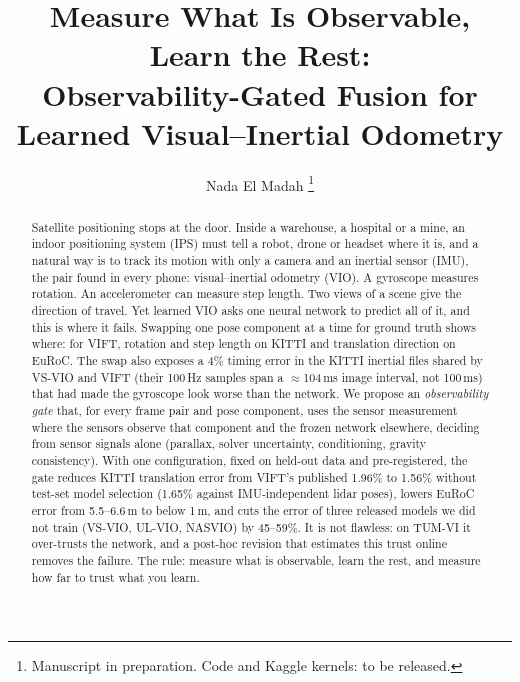 \documentclass[letterpaper,journal]{IEEEtran}
\begin{document}
\title{Measure What Is Observable, Learn the Rest:\\Observability-Gated Fusion for Learned Visual--Inertial Odometry}

\author{Nada El Madah%
\thanks{Manuscript in preparation. Code and Kaggle kernels: to be released.}}


\maketitle

\begin{abstract}
Satellite positioning stops at the door. Inside a warehouse, a hospital or a mine, an indoor positioning system (IPS) must tell a robot, drone or headset where it is, and a natural way is to track its motion with only a camera and an inertial sensor (IMU), the pair found in every phone: visual--inertial odometry (VIO). A gyroscope measures rotation. An accelerometer can measure step length. Two views of a scene give the direction of travel. Yet learned VIO asks one neural network to predict all of it, and this is where it fails. Swapping one pose component at a time for ground truth shows where: for VIFT, rotation and step length on KITTI and translation direction on EuRoC. The swap also exposes a 4\% timing error in the KITTI inertial files shared by VS-VIO and VIFT (their 100\,Hz samples span a $\approx$104\,ms image interval, not 100\,ms) that had made the gyroscope look worse than the network. We propose an \emph{observability gate} that, for every frame pair and pose component, uses the sensor measurement where the sensors observe that component and the frozen network elsewhere, deciding from sensor signals alone (parallax, solver uncertainty, conditioning, gravity consistency). With one configuration, fixed on held-out data and pre-registered, the gate reduces KITTI translation error from VIFT's published 1.96\% to 1.56\% without test-set model selection (1.65\% against IMU-independent lidar poses), lowers EuRoC error from 5.5--6.6\,m to below 1\,m, and cuts the error of three released models we did not train (VS-VIO, UL-VIO, NASVIO) by 45--59\%. It is not flawless: on TUM-VI it over-trusts the network, and a post-hoc revision that estimates this trust online removes the failure. The rule: measure what is observable, learn the rest, and measure how far to trust what you learn.
\end{abstract}
\end{document}
